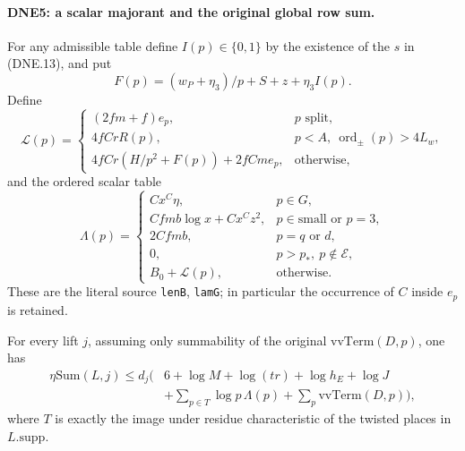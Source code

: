 \documentclass[11pt,a4paper]{article}
\numberwithin{equation}{section}
\theoremstyle{remark}\newtheorem{remark}[theorem]{Remark}
\begin{document}
\paragraph{DNE5: a scalar majorant and the original global row sum.}
\label{claim:DNE5}
For any admissible table define $I(p)\in\{0,1\}$ by the existence
of the $s$ in (DNE.13), and put
\[
 F(p)=(w_P+\eta_3)/p+S+z+\eta_3I(p).
\]
Define
\[
 \mathcal L(p)=
 \begin{cases}
 (2fm+f)e_p,&p\text{ split},\\
 4fCrR(p),&p<A,\ \operatorname{ord}_{\pm}(p)>4L_w,\\
 4fCr(H/p^2+F(p))+2fCm e_p,&\text{otherwise},
 \end{cases}                                                     \tag{DNE.17}
\]
and the ordered scalar table
\[
 \Lambda(p)=
 \begin{cases}
 Cx^C\eta,&p\in G,\\
 Cfm b\log x+Cx^Cz^2,&p\in\mathrm{small}\text{ or }p=3,\\
 2Cfm b,&p=q\text{ or }d,\\
 0,&p>p_*,\ p\notin\mathcal E,\\
 B_0+\mathcal L(p),&\text{otherwise}.
 \end{cases}                                                     \tag{DNE.18}
\]
These are the literal source \texttt{len\allowbreak B}, \texttt{lam\allowbreak G}; in
particular the occurrence of $C$ inside $e_p$ is retained.

For every lift $j$, assuming only summability of the original
$\mathrm{vvTerm}(D,p)$, one has
\[
\begin{split}
 \eta\mathrm{Sum}(L,j)\le d_j\biggl(&6+\log M+\log(tr)
                      +\log h_E+\log J\\
             &+\sum_{p\in T}\log p\,\Lambda(p)
                         +\sum_p\mathrm{vvTerm}(D,p)\biggr),
\end{split}                                                       \tag{DNE.19}
\]
where $T$ is exactly the image under residue characteristic of the
twisted places in $L.\mathrm{supp}$.
\end{document}
